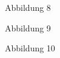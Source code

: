 \documentclass[a4paper, 12pt, oneside]{article}
\begin{document}
    \begin{figure}
        \centering
        \caption{Abbildung 8}
    \end{figure}

    \begin{figure}
        \centering
        \caption{Abbildung 9}
    \end{figure}

    \begin{figure}
        \centering
        \caption{Abbildung 10}
    \end{figure}
\end{document}
